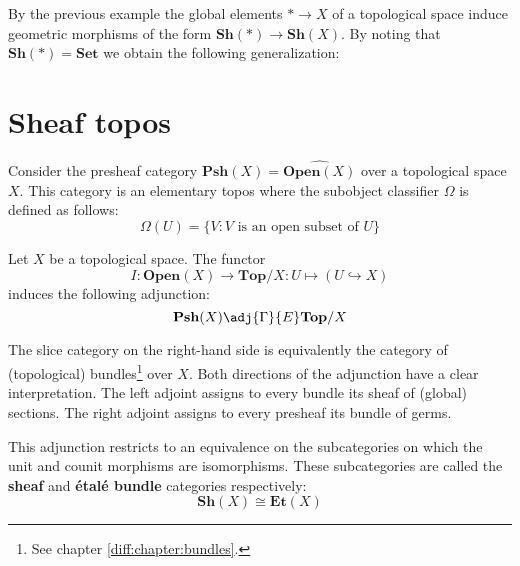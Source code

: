 	By the previous example the global elements $\ast\rightarrow X$ of a topological space induce geometric morphisms of the form $\textbf{Sh}(\ast)\rightarrow\textbf{Sh}(X)$. By noting that $\textbf{Sh}(\ast)=\textbf{Set}$ we obtain the following generalization:
	
	
\section{Sheaf topos}

	\begin{property}
		Consider the presheaf category $\textbf{Psh}(X) = \widehat{\textbf{Open}(X)}$ over a topological space $X$. This category is an elementary topos where the subobject classifier $\Omega$ is defined as follows:
		\begin{equation}
			\Omega(U) = \{V:V\text{ is an open subset of }U\}
		\end{equation}
	\end{property}
	
	\begin{construct}
		Let $X$ be a topological space. The functor \[I:\textbf{Open}(X)\rightarrow\textbf{Top}/X:U\mapsto(U\hookrightarrow X)\] induces the following adjunction:
		\begin{equation}
			\label{category:etale_adjunction}
			\textbf{Psh}(X) \adj{\Gamma}{E} \textbf{Top}/X
		\end{equation}
		
		The slice category on the right-hand side is equivalently the category of (topological) bundles\footnote{See chapter \ref{diff:chapter:bundles}.} over $X$. Both directions of the adjunction have a clear interpretation. The left adjoint assigns to every bundle its sheaf of (global) sections. The right adjoint assigns to every presheaf its bundle of germs.
		
		This adjunction restricts to an equivalence on the subcategories on which the unit and counit morphisms are isomorphisms. These subcategories are called the \textbf{sheaf} and \textbf{\'etal\'e bundle} categories respectively:
		\begin{equation}
			\textbf{Sh}(X) \cong \textbf{Et}(X)
		\end{equation}
	\end{construct}
	

